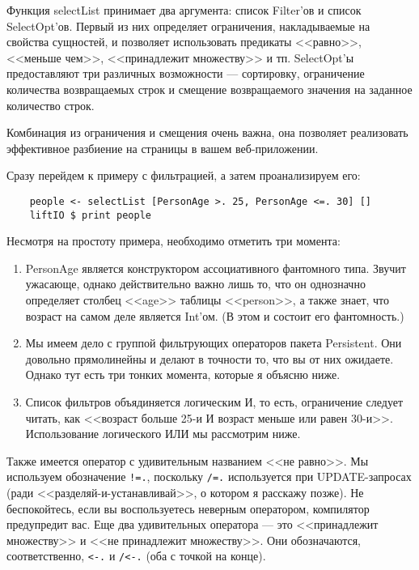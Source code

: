 Функция selectList принимает два аргумента: список Filter'ов и список SelectOpt'ов. Первый из них определяет ограничения, накладываемые на свойства сущностей, и позволяет использовать предикаты <<равно>>, <<меньше чем>>, <<принадлежит множеству>> и тп. SelectOpt'ы предоставляют три различных возможности --- сортировку, ограничение количества возвращаемых строк и смещение возвращаемого значения на заданное количество строк.

\begin{remark}
Комбинация из ограничения и смещения очень важна, она позволяет реализовать эффективное разбиение на страницы в вашем веб-приложении.
\end{remark}

Сразу перейдем к примеру с фильтрацией, а затем проанализируем его:

\begin{lstlisting}
    people <- selectList [PersonAge >. 25, PersonAge <=. 30] []
    liftIO $ print people
\end{lstlisting}%

Несмотря на простоту примера, необходимо отметить три момента:

\begin{enumerate}
\item PersonAge является конструктором ассоциативного фантомного типа. Звучит ужасающе, однако действительно важно лишь то, что он однозначно определяет столбец <<age>> таблицы <<person>>, а также знает, что возраст на самом деле является Int'ом. (В этом и состоит его фантомность.)
\item Мы имеем дело с группой фильтрующих операторов пакета Persistent. Они довольно прямолинейны и делают в точности то, что вы от них ожидаете. Однако тут есть три тонких момента, которые я объясню ниже.
\item Список фильтров объядиняется логическим И, то есть, ограничение следует читать, как <<возраст больше 25-и И возраст меньше или равен 30-и>>. Использование логического ИЛИ мы рассмотрим ниже.
\end{enumerate}

Также имеется оператор с удивительным названием <<не равно>>. Мы используем обозначение \lstinline'!=.', поскольку \lstinline'/=.' используется при UPDATE-запросах (ради <<разделяй-и-устанавливай>>, о котором я расскажу позже). Не беспокойтесь, если вы воспользуетесь неверным оператором, компилятор предупредит вас. Еще два удивительных оператора --- это <<принадлежит множеству>> и <<не принадлежит множеству>>. Они обозначаются, соответственно, \lstinline'<-.' и \lstinline'/<-.' (оба с точкой на конце).

